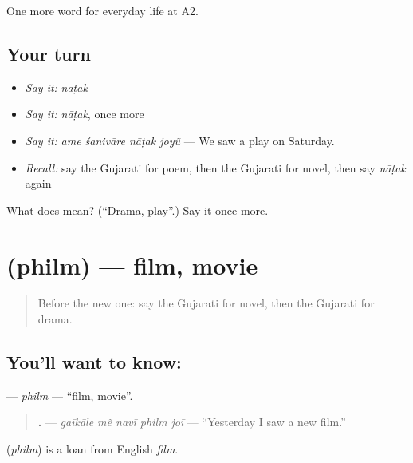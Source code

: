 \begin{grammarlens}[title={What you've built}]
One more word for everyday life at A2.
\end{grammarlens}

\subsection*{Your turn}
\begin{itemize}
\raggedright
  \item \emph{Say it:} \emph{nāṭak}
  \item \emph{Say it:} \emph{nāṭak}, once more
  \item \emph{Say it:} \emph{ame śanivāre nāṭak joyũ} — We saw a play on Saturday.
  \item \emph{Recall:} say the Gujarati for poem, then the Gujarati for novel, then say \emph{nāṭak} again
\end{itemize}

\begin{tcolorbox}[breakable,colback=teal!4,colframe=teal!35!black,title={Before you move on}]
What does  mean? (\textquotedblleft{}Drama, play\textquotedblright{}.) Say it once more.
\end{tcolorbox}
\section[\texorpdfstring{\gu{ફિલ્મ} (philm)}{ફિલ્મ (philm)}]{ (philm) — film, movie}

\label{lesson:GU-C255-philm}



\begin{quote}
Before the new one: say the Gujarati for novel, then the Gujarati for drama.
\end{quote}

\subsection*{You'll want to know: }
\textbf{} — \emph{philm} — \textquotedblleft{}film, movie\textquotedblright{}.

\begin{quote}
\textbf{    .} — \emph{gaīkāle mẽ navī philm joī} — \textquotedblleft{}Yesterday I saw a new film.\textquotedblright{}
\end{quote}

\begin{cousinweb}
\textbf{} (\emph{philm}) is a loan from English \emph{film}.
\end{cousinweb}


